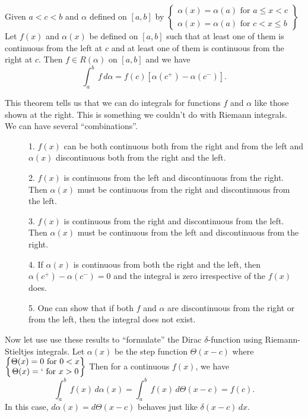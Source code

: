 \begin{theorem}
Given $a < c < b$ and $\alpha$ defined on $[a,b]$ by 
$\left\{ \begin{matrix}
\alpha(x) = \alpha(a) \mbox{ for } a\le x < c \\
\alpha(x) = \alpha(a) \mbox{ for } c < x \le b
\end{matrix}\right\}$
Let $f(x)$ and $\alpha(x)$ be defined on $[a,b]$ such that at least one of them is continuous from the left at $c$ and at least one of them is continuous from the right at $c$. Then 
$f\in R(\alpha)$ on $[a,b]$ and we have
$$\int_a^b \, f\, d\alpha = f(c)\left[ \alpha(c^+) - \alpha(c^-)\right].$$
\end{theorem}
This theorem tells us that we can do integrals for functions $f$ and $\alpha$ like those shown at the right. This is something we couldn't do with Riemann integrals. \\
We can have several ``combinations''.
\begin{description}
\item[] 1. $f(x)$ can be both continuous both from the right and from the left and $\alpha(x)$ discontinuous both from the right and the left.
\item[] 2. $f(x)$ is continuous from the left and discontinuous from the right. Then $\alpha(x)$ must be continuous from the right and discontinuous from the left.
\item[] 3. $f(x)$ is continuous from the right and discontinuous from the left. Then $\alpha(x)$ must be continuous from the left and discontinuous from the right.
\item[] 4. If $\alpha(x)$ is continuous from both the right and the left, then $\alpha(c^+) - \alpha(c^-) = 0$ and the integral is zero irrespective of the $f(x)$ does.
\item[] 5. One can show that if both $f$ and $\alpha$ are discontinuous from the right or from the left, then the integral does not exist.
\end{description}
Now let use use these results to ``formulate'' the Dirac $\delta$-function using Riemann-Stieltjes integrals. Let $\alpha(x)$ be the step function $\Theta(x-c)$ where
$\left\{ \begin{matrix}
\Theta(x) = 0 \mbox{ for }  0 < x\\
\Theta(x) = `\mbox{ for }    x > 0
\end{matrix}\right\}$
Then for a continuous $f(x)$, we have 
$$\int_a^b\, f(x)\, d\alpha(x) = \int_a^b\, f(x) \, d\Theta(x-c) = f(c).$$
In this case, $d\alpha(x) = d\Theta(x-c)$ behaves just like $\delta(x-c)\, dx$.\\
